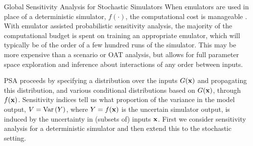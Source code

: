 \begin{chapter}{Global Sensitivity Analysis for Stochastic Simulators\label{Ch:sensitivity}}
When emulators are used in place of a deterministic simulator, $f(\cdot)$, the computational cost is manageable \cite{Becker2012, Overstall2016}. With emulator assisted probabilistic sensitivity analysis, the majority of the computational budget is spent on training an appropriate emulator, which will typically be of the order of a few hundred runs of the simulator. This may be more expensive than a scenario or OAT analysis, but allows for full parameter space exploration and inference about interactions of any order between inputs.

PSA proceeds by specifying a distribution over the inputs $G(\mathbf{x})$ and propagating this distribution, and various conditional distributions based on $G(\mathbf{x})$, through $f(\mathbf{x})$. Sensitivity indices tell us what proportion of the variance in the model output, $V = \mathrm{Var}\,(Y)$, where $Y = f(\mathbf{x})$ is the uncertain simulator output, is induced by the uncertainty in (subsets of) inputs $\mathbf{x}$. First we consider sensitivity analysis for a deterministic simulator and then extend this to the stochastic setting.

\end{chapter}
